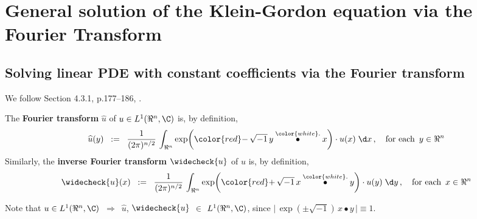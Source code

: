 

\chapter{General solution of the Klein-Gordon equation via the Fourier Transform}
\setcounter{theorem}{0}
\setcounter{equation}{0}


\renewcommand{\theenumi}{\roman{enumi}}
\renewcommand{\labelenumi}{\textnormal{(\theenumi)}$\;\;$}


\section{Solving linear PDE with constant coefficients via the Fourier transform}

We follow Section 4.3.1, p.177--186, \cite{Evans2010}.

\begin{definition}
\mbox{}
\vskip 0.1cm
\noindent
The \textbf{Fourier transform} $\widehat{u}$ of $u \in L^{1}(\Re^{n},\C)$ is, by definition,
\begin{equation*}
\widehat{u}(y)
\;\; := \;\;
	\dfrac{1}{(2\pi)^{n/2}}\,
	\int_{\Re^{n}}
		\exp\!\left({\color{red}-}\,\sqrt{-1}\, y \overset{{\color{white}.}}{\bullet} x\right) \cdot u(x)
		\;\d x\,,
\quad
\textnormal{for each \,$y \in \Re^{n}$}
\end{equation*}
Similarly, the \textbf{inverse Fourier transform} $\widecheck{u}$ of $u$ is, by definition,
\begin{equation*}
\widecheck{u}(x)
\;\; := \;\;
	\dfrac{1}{(2\pi)^{n/2}}\,
	\int_{\Re^{n}}
		\exp\!\left({\color{red}+}\,\sqrt{-1}\, x \overset{{\color{white}.}}{\bullet} y\right) \cdot u(y)
		\;\d y\,,
\quad
\textnormal{for each \,$x \in \Re^{n}$}
\end{equation*}
\end{definition}
Note that $u \in L^{1}(\Re^{n},\C)$ \,$\Longrightarrow$\, $\widehat{u}$, $\widecheck{u}$ $\in$ $L^{1}(\Re^{n},\C)$,
since $\vert\,\exp(\pm\sqrt{-1})\,x \bullet y\,\vert \equiv 1$.

